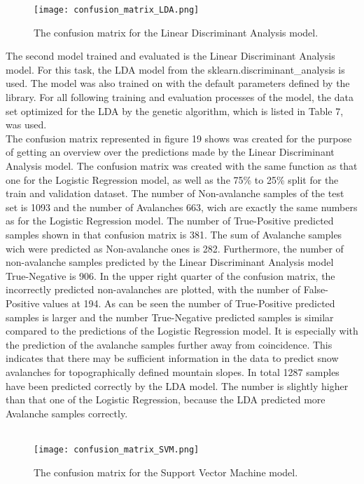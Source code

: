 \documentclass[../masterarbeit.tex]{subfiles}
\begin{document}
\begin{figure}[h]
    \centering
    \texttt{[image: confusion\_matrix\_LDA.png]}
    \caption{The confusion matrix for the Linear Discriminant Analysis model.}
\end{figure}
The second model trained and evaluated is the Linear Discriminant Analysis model.
For this task, the LDA model from the sklearn.discriminant\_analysis \textcite[]{Scikit-learn-lda:2022} is used. The model was also trained on with the default parameters defined by the library. For all following training and evaluation processes of the model, the data set optimized for the LDA by the genetic algorithm, which is listed in Table 7, was used. \\
The confusion matrix represented in figure 19 shows was created for the purpose of getting an overview over the predictions made by the Linear Discriminant Analysis model. The confusion matrix was created with the same function as that one for the Logistic Regression model, as well as the 75\% to 25\% split for the train and validation dataset. The number of Non-avalanche samples of the test set is 1093 and the number of Avalanches 663, wich are exactly the same numbers as for the Logistic Regression model.
The number of True-Positive predicted samples shown in that confusion matrix is 381. The sum of Avalanche samples wich were predicted as Non-avalanche ones is 282. Furthermore, the number of non-avalanche samples predicted by the Linear Discriminant Analysis model True-Negative is 906. In the upper right quarter of the confusion matrix, the incorrectly predicted non-avalanches are plotted, with the number of False-Positive values at 194. As can be seen the number of True-Positive predicted samples is larger  and the number True-Negative predicted samples is similar compared to the predictions of the Logistic Regression model. It is especially with the prediction of the avalanche samples further away from coincidence. This indicates that there may be sufficient information in the data to predict snow avalanches for topographically defined mountain slopes. In total 1287 samples have been predicted correctly by the LDA model. The number is slightly higher than that one of the Logistic Regression, because the LDA predicted more Avalanche samples correctly.\\~\\
\begin{figure}[h]
    \centering
    \texttt{[image: confusion\_matrix\_SVM.png]}
    \caption{The confusion matrix for the Support Vector Machine model.}
\end{figure}
\end{document}
